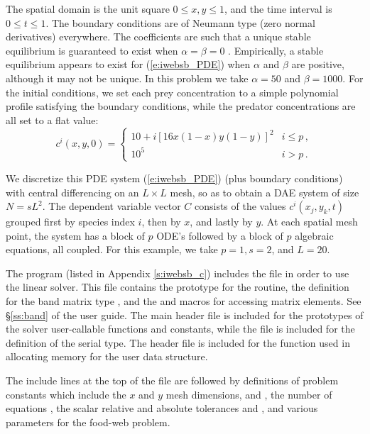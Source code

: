The spatial domain is the unit square $0 \leq x,y \leq 1$, and the
time interval is $0 \leq t \leq 1$.  The boundary conditions are of
Neumann type (zero normal derivatives) everywhere.  The coefficients
are such that a unique stable equilibrium is guaranteed to exist when
$\alpha = \beta = 0$ \cite{Bro:86}.  Empirically, a stable equilibrium
appears to exist for (\ref{e:iwebsb_PDE}) when $\alpha$ and $\beta$ are
positive, although it may not be unique. In this problem we take
$\alpha = 50$ and $\beta = 1000$.  For the initial conditions, we set
each prey concentration to a simple polynomial profile satisfying the
boundary conditions, while the predator concentrations are all set to
a flat value:
\begin{equation*}
c^i(x,y,0) = 
\begin{cases}
  10 + i [16x(1 - x)y(1 - y)]^2 & i \leq p \, , \\
  10^5                          & i > p \, .
\end{cases}
\end{equation*}

We discretize this PDE system (\ref{e:iwebsb_PDE}) (plus boundary conditions)
with central differencing on an $L \times L$ mesh, so as to obtain a
DAE system of size $N = s L^2$.  The dependent variable vector $C$
consists of the values $c^i(x_j,y_k,t)$ grouped first by species index
$i$, then by $x$, and lastly by $y$.  At each spatial mesh point, the
system has a block of $p$ ODE's followed by a block of $p$ algebraic
equations, all coupled.
For this example, we take $p = 1, s = 2$, and $L = 20$.

The  program (listed in Appendix \ref{s:iwebsb_c})
includes the file  in order to use the {\idaband} linear solver. 
This file contains the prototype for the  routine,
the definition for the band matrix type , and the
 and  macros for accessing matrix
elements. See \S\ref{ss:band} of the user guide.
The main {\ida} header file  is included for the prototypes of the
solver user-callable functions and {\ida} constants, while the file 
is included for the definition of the serial  type.
The header file  is included for the  function
used in allocating memory for the user data structure.

The include lines at the top of the file are followed by definitions of
problem constants which include the $x$ and $y$ mesh dimensions,  and
, the number of equations , the scalar relative and absolute tolerances
 and , and various parameters for the food-web problem.

